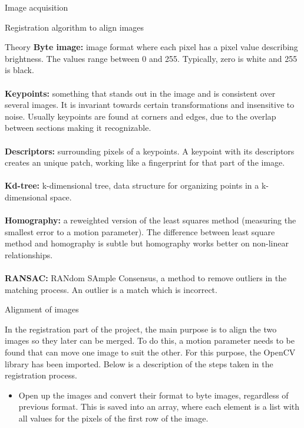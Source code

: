\documentclass[10pt]{article}
\begin{document}
\begin{section}{Image acquisition}
    \begin{subsection}{Registration algorithm to align images}
        \label{sec:image_registration}
        \begin{subsubsection}{Theory}
            \textbf{Byte image:} image format where each pixel has a pixel value describing brightness. The values range between 0 and 255. Typically, zero is white and 255 is black.
            \\ \\
            \textbf{Keypoints:} something that stands out in the image and is consistent over several images. It is invariant towards certain transformations and insensitive to noise. Usually keypoints are found at corners and edges, due to the overlap between sections making it recognizable.
            \\ \\
            \textbf{Descriptors:} surrounding pixels of a keypoints. A keypoint with its descriptors creates an unique patch, working like a fingerprint for that part of the image.
            \\ \\
            \textbf{Kd-tree:} k-dimensional tree, data structure for organizing points in a k-dimensional space.
            \\ \\
            \textbf{Homography:} a reweighted version of the least squares method (measuring the smallest error to a motion parameter). The difference between least square method and homography is subtle but homography works better on non-linear relationships.
            \\ \\
            \textbf{RANSAC:} RANdom SAmple Consensus, a method to remove outliers in the matching process. An outlier is a match which is incorrect.
        \end{subsubsection}

        \begin{subsubsection}{Alignment of images}

            In the registration part of the project, the main purpose is to align the two images so they later can be merged. To do this, a motion parameter needs to be found that can move one image to suit the other. For this purpose, the OpenCV library has been imported. Below is a description of the steps taken in the registration process.

            \begin{itemize}
                \item Open up the images and convert their format to byte images, regardless of previous format. This is saved into an array, where each element is a list with all values for the pixels of the first row of the image.


\end{itemize}
\end{subsubsection}
\end{subsection}
\end{section}
\end{document}
